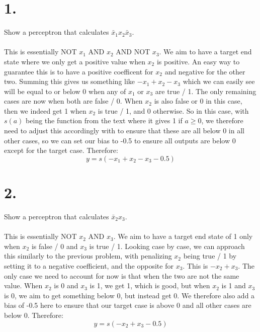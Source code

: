 \documentclass{article}
\begin{document}
\thispagestyle{firstpageheader}
{\Large 

\section*{1.}
Show a perceptron that calculates \(\bar{x}_1 x_2 \bar{x}_3\). \\ \\
This is essentially NOT \(x_1\) AND \(x_2\) AND NOT \(x_3\). We aim to have a target end state where we only get a positive value when \(x_2\) is positive. An easy way to guarantee this is to have a positive coefficent for \(x_2\) and negative for the other two. Summing this gives us something like \(-x_1 + x_2 - x_3\) which we can easily see will be equal to or below 0 when any of \(x_1\) or \(x_3\) are true / 1. The only remaining cases are now when both are false / 0. When \(x_2\) is also false or 0 in this case, then we indeed get 1 when \(x_2\) is true / 1, and 0 otherwise. So in this case, with \(s(a)\) being the function from the text where it gives 1 if \(a \geq 0\), we therefore need to adjust this accordingly with to ensure that these are all below 0 in all other cases, so we can set our bias to -0.5 to ensure all outputs are below 0 except for the target case. Therefore:
\[
  \boxed{y = s(-x_1 + x_2 - x_3 - 0.5)}
\]

}
{\Large 

\section*{2.}
Show a perceptron that calculates \(\bar{x}_2 x_3\). \\ \\
This is essentially NOT \(x_2\) AND \(x_3\). We aim to have a target end state of 1 only when \(x_2\) is false / 0 and \(x_3\) is true / 1. Looking case by case, we can approach this similarly to the previous problem, with penalizing \(x_2\) being true / 1 by setting it to a negative coefficient, and the opposite for \(x_3\). This is \(-x_2 + x_3\). The only case we need to account for now is that when the two are not the same value. When \(x_2\) is 0 and \(x_3\) is 1, we get 1, which is good, but when \(x_2\) is 1 and \(x_3\) is 0, we aim to get something below 0, but instead get 0. We therefore also add a bias of -0.5 here to ensure that our target case is above 0 and all other cases are below 0. Therefore:
\[
  \boxed{y = s(-x_2 + x_3 - 0.5)}
\]

}
\end{document}
